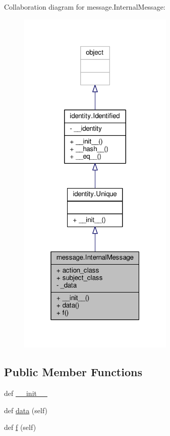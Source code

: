 Collaboration diagram for message.\+Internal\+Message\+:
\nopagebreak
\begin{figure}[H]
\begin{center}
\leavevmode
\includegraphics[width=211pt]{classmessage_1_1InternalMessage__coll__graph}
\end{center}
\end{figure}
\subsection*{Public Member Functions}
\begin{DoxyCompactItemize}
\item 
def \hyperlink{classmessage_1_1InternalMessage_a706723771ed57321cb3704605dd224b3}{\+\_\+\+\_\+init\+\_\+\+\_\+}
\item 
def \hyperlink{classmessage_1_1InternalMessage_a91bab1274078ed322914001d0bcc3a0b}{data} (self)
\item 
def \hyperlink{classmessage_1_1InternalMessage_aa68198bb7742b59e6bf138b820aef38d}{f} (self)
\end{DoxyCompactItemize}
